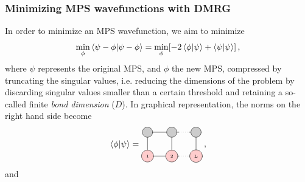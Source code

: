 \documentclass[twoside,twocolumn,9pt]{article}
\begin{document}
\subsubsection{Minimizing MPS wavefunctions with DMRG}
In order to minimize an MPS wavefunction, we aim to minimize
\begin{equation}
  \min_\phi \bra{\psi - \phi}\ket{\psi - \phi} = \min_\phi [-2\bra{\phi}\ket{\psi} + \bra{\psi}\ket{\psi}] \thinspace ,
\end{equation}
where $\psi$ represents the original MPS, and $\phi$ the new MPS, compressed by truncating the singular values, i.e. reducing the dimensions of the problem by discarding singular values smaller than a certain threshold and retaining a so-called finite \emph{bond dimension} ($D$). In graphical representation, the norms on the right hand side become
\begin{equation} 
    \bra{\phi}\ket{\psi} =
  \begin{tikzpicture}[baseline={([yshift=-.5ex]current bounding box.center)}]
    \draw[gray, thick] (0,0) -- (0,-1);
    \draw[gray, thick] (1,0) -- (1,-1);
    \draw[gray, thick] (2,0) -- (2,-1);

    \draw[gray, thick] (0,0) -- (1.3,0);
    \draw[gray, dotted] (1.3,0) -- (1.7,0);
    \draw[gray, thick] (1.7,0) -- (2.0,0);

    \draw[gray, thick] (0,-1) -- (1.3,-1);
    \draw[gray, dotted] (1.3,-1) -- (1.7,-1);
    \draw[gray, thick] (1.7,-1) -- (2.0,-1);

    \node[draw, circle, line cap=round, fill=black!20, minimum size=12] at (0,0) {  };
    \node[draw, circle, line cap=round, fill=black!20, minimum size=12] at (1,0) {  };
    \node[draw, circle, line cap=round, fill=black!20, minimum size=12] at (2,0) {  };

    \node[draw, circle, line cap=round, fill=red!20] at (0,-1) {\tiny 1};
    \node[draw, circle, line cap=round, fill=red!20] at (1,-1) {\tiny 2};
    \node[draw, circle, line cap=round, fill=red!20] at (2,-1) {\tiny L};
  \end{tikzpicture} \thinspace ,
\end{equation}
and
\end{document}
